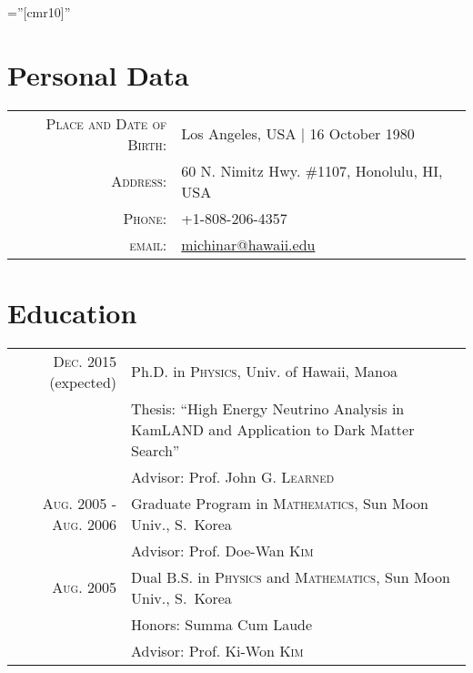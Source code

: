 \documentclass[a4paper,10pt]{article} %
\begin{document}
\pagestyle{empty} %

\font\fb=''[cmr10]'' %


\par{\bigskip\par} %

\section{Personal Data}

\begin{tabular}{rl}
\textsc{Place and Date of Birth:} & Los Angeles, USA  | 16 October 1980\\
\textsc{Address:} & 60 N. Nimitz Hwy. \#1107, Honolulu, HI, USA\\
\textsc{Phone:} & +1-808-206-4357\\
\textsc{email:} & \href{mailto:michinar@hawaii.edu}{michinar@hawaii.edu}
\end{tabular}


\section{Education}

\begin{tabular}{rp{10.3cm}}	
	\textsc{Dec.} 2015 (expected) & Ph.D. in \textsc{Physics},
	Univ. of Hawaii, Manoa\\
	& \small Thesis: ``High Energy Neutrino Analysis in KamLAND and Application
	to Dark Matter Search''\\
	& \small Advisor: Prof. John G. \textsc{Learned}\\


	\textsc{Aug.} 2005 - \textsc{Aug.} 2006 & Graduate Program in
	\textsc{Mathematics}, Sun Moon Univ., S.~Korea\\
	& \small Advisor: Prof. Doe-Wan \textsc{Kim}\\


	\textsc{Aug.} 2005 & Dual B.S. in \textsc{Physics} and
	\textsc{Mathematics}, Sun Moon Univ., S.~Korea\\
	& \small Honors: Summa Cum Laude\\
	& \small Advisor: Prof. Ki-Won \textsc{Kim}\\


\end{tabular}
\end{document}
